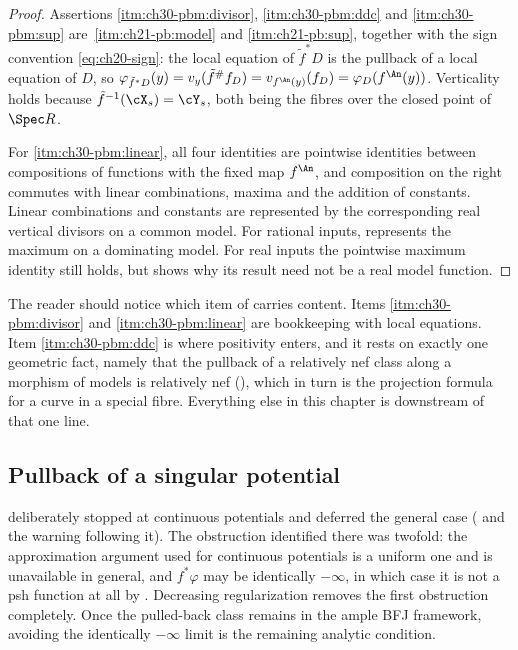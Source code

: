 \begin{proof}
Assertions \cref{itm:ch30-pbm:divisor}, \cref{itm:ch30-pbm:ddc} and
\cref{itm:ch30-pbm:sup} are
\,\cref{itm:ch21-pb:model} and
\cref{itm:ch21-pb:sup}, together with the sign convention
\eqref{eq:ch20-sign}: the local equation of $\tilde f^*D$ is the pullback
of a local equation of $D$, so
$\varphi_{\tilde f^*D}(y)=v_y(\tilde f^\#f_D)=v_{f^{\An}(y)}(f_D)
=\varphi_D(f^{\An}(y))$.  Verticality holds because
$\tilde f^{-1}(\cX_s)=\cY_s$, both being the fibres over the closed point
of $\Spec R$.

For \cref{itm:ch30-pbm:linear}, all four identities are pointwise identities
between compositions of functions with the fixed map $f^{\An}$, and
composition on the right commutes with linear combinations, maxima and the
addition of constants.  Linear combinations and constants are represented
by the corresponding real vertical divisors on a common model.
For rational inputs,  represents the maximum
on a dominating model.  For real inputs the pointwise maximum identity
still holds, but  shows why
its result need not be a real model function.
\end{proof}

The reader should notice which item of
 carries content.  Items
\cref{itm:ch30-pbm:divisor} and \cref{itm:ch30-pbm:linear} are bookkeeping
with local equations.  Item \cref{itm:ch30-pbm:ddc} is where positivity
enters, and it rests on exactly one geometric fact, namely that the pullback
of a relatively nef class along a morphism of models is relatively nef
(), which in turn is the projection formula for a
curve in a special fibre.  Everything else in this chapter is downstream of
that one line.

\subsection{Pullback of a singular potential}
\label{sec:ch30-pullback-singular}

 deliberately stopped at continuous potentials and
deferred the general case ( and the warning
following it).  The obstruction identified there was twofold: the
approximation argument used for continuous potentials is a uniform one and
is unavailable in general, and $f^*\varphi$ may be identically $-\infty$,
in which case it is not a psh function at all by
.  Decreasing regularization removes the first
obstruction completely.  Once the pulled-back class remains in the ample
BFJ framework, avoiding the identically $-\infty$ limit is the remaining
analytic condition.

